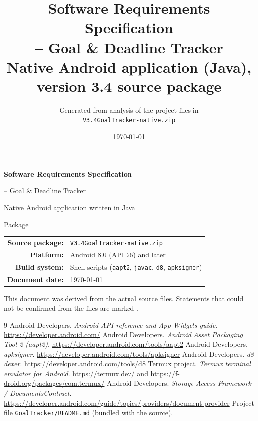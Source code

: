 \documentclass[11pt,a4paper,oneside,openany]{book}
\title{\Huge\bfseries Software Requirements Specification\\[0.4em]
       \Large \appname{} -- Goal \& Deadline Tracker\\[0.3em]
       \large Native Android application (Java), version 3.4 source package}
\author{Generated from analysis of the project files in\\
        \texttt{V3.4GoalTracker-native.zip}}
\date{\today}
\begin{document}
\begin{titlepage}
\centering
\vspace*{3cm}
{\Huge\bfseries Software Requirements Specification\par}
\vspace{1cm}
{\LARGE \appname{} -- Goal \& Deadline Tracker\par}
\vspace{0.5cm}
{\large Native Android application written in Java\par
  Package \texttt{\pkgname}\par}
\vspace{2cm}
\begin{tabular}{rl}
  \textbf{Source package:} & \texttt{V3.4GoalTracker-native.zip}\\
  \textbf{Platform:} & Android 8.0 (API 26) and later\\
  \textbf{Build system:} & Shell scripts (\texttt{aapt2}, \texttt{javac}, \texttt{d8}, \texttt{apksigner})\\
  \textbf{Document date:} & \today\\
\end{tabular}
\vfill
{\small This document was derived from the actual source files. Statements that could
not be confirmed from the files are marked \unverified{}.\par}
\end{titlepage}

\frontmatter
\pagestyle{plain}
\tableofcontents
\listoffigures
\listoftables

\mainmatter
\pagestyle{fancy}












\appendix


\begin{thebibliography}{9}
 Android Developers. \emph{Android API reference and App Widgets guide}.
  \url{https://developer.android.com/}
 Android Developers. \emph{Android Asset Packaging Tool 2 (aapt2)}.
  \url{https://developer.android.com/tools/aapt2}
 Android Developers. \emph{apksigner}.
  \url{https://developer.android.com/tools/apksigner}
 Android Developers. \emph{d8 dexer}.
  \url{https://developer.android.com/tools/d8}
 Termux project. \emph{Termux terminal emulator for Android}.
  \url{https://termux.dev/} and \url{https://f-droid.org/packages/com.termux/}
 Android Developers. \emph{Storage Access Framework / DocumentsContract}.
  \url{https://developer.android.com/guide/topics/providers/document-provider}
 Project file \texttt{GoalTracker/README.md} (bundled with the source).
\end{thebibliography}
\end{document}
